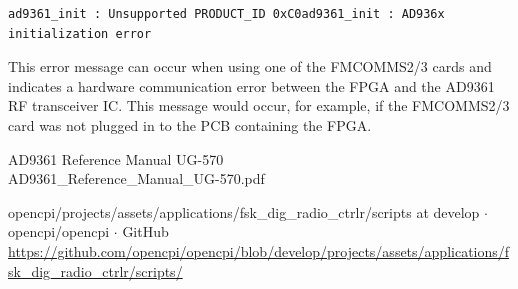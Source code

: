     \begin{lstlisting}
ad9361_init : Unsupported PRODUCT_ID 0xC0ad9361_init : AD936x initialization error
    \end{lstlisting}
    This error message can occur when using one of
    the FMCOMMS2/3 cards and 
    indicates
    a hardware communication error between the FPGA and the AD9361 RF
    transceiver
    IC. This message
    would occur, for example, if the FMCOMMS2/3 card
    was not plugged in to the PCB containing the
    FPGA.

\begin{thebibliography}{1}

   AD9361 Reference Manual UG-570\\
    AD9361\_Reference\_Manual\_UG-570.pdf

   opencpi/projects/assets/applications/fsk\_dig\_radio\_ctrlr/scripts at develop $\cdot$ opencpi/opencpi $\cdot$ GitHub\\
    \url{https://github.com/opencpi/opencpi/blob/develop/projects/assets/applications/fsk_dig_radio_ctrlr/scripts/}

\end{thebibliography}


